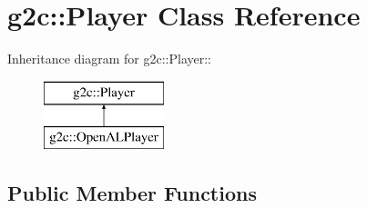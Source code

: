 \hypertarget{classg2c_1_1_player}{
\section{g2c::Player Class Reference}
\label{classg2c_1_1_player}
}
Inheritance diagram for g2c::Player::\begin{figure}[H]
\begin{center}
\leavevmode
\includegraphics[height=2cm]{classg2c_1_1_player}
\end{center}
\end{figure}
\subsection*{Public Member Functions}

